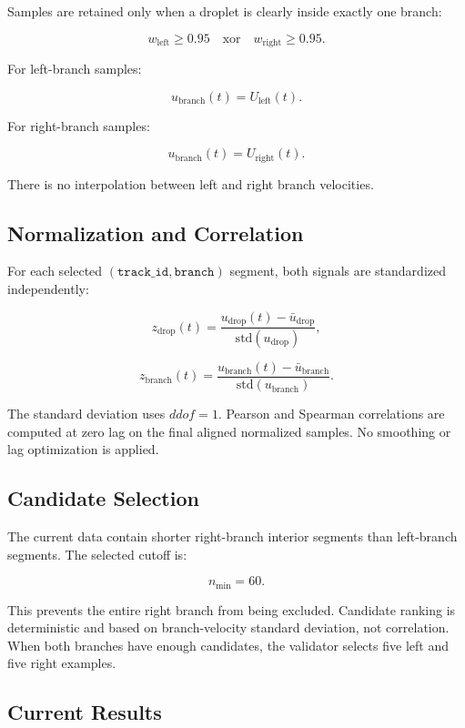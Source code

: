 Samples are retained only when a droplet is clearly inside exactly one branch:

\[
w_{\mathrm{left}} \ge 0.95
\quad \mathrm{xor} \quad
w_{\mathrm{right}} \ge 0.95.
\]

For left-branch samples:

\[
u_{\mathrm{branch}}(t) = U_{\mathrm{left}}(t).
\]

For right-branch samples:

\[
u_{\mathrm{branch}}(t) = U_{\mathrm{right}}(t).
\]

There is no interpolation between left and right branch velocities.

\subsection{Normalization and Correlation}

For each selected \((\texttt{track\_id}, \texttt{branch})\) segment, both
signals are standardized independently:

\[
z_{\mathrm{drop}}(t)
=
\frac{u_{\mathrm{drop}}(t)-\bar{u}_{\mathrm{drop}}}
{\mathrm{std}(u_{\mathrm{drop}})},
\]

\[
z_{\mathrm{branch}}(t)
=
\frac{u_{\mathrm{branch}}(t)-\bar{u}_{\mathrm{branch}}}
{\mathrm{std}(u_{\mathrm{branch}})}.
\]

The standard deviation uses \(ddof=1\). Pearson and Spearman correlations are
computed at zero lag on the final aligned normalized samples. No smoothing or
lag optimization is applied.

\subsection{Candidate Selection}

The current data contain shorter right-branch interior segments than left-branch
segments. The selected cutoff is:

\[
n_{\min}=60.
\]

This prevents the entire right branch from being excluded. Candidate ranking is
deterministic and based on branch-velocity standard deviation, not correlation.
When both branches have enough candidates, the validator selects five left and
five right examples.

\subsection{Current Results}

